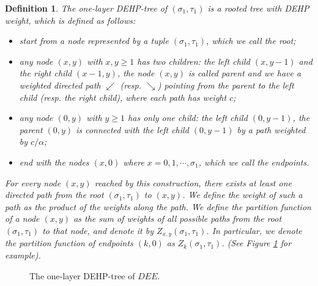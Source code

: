\documentclass[12pt,a4paper]{amsart}
\newtheorem{definition}[theorem]{Definition}
\theoremstyle{remark}
\numberwithin{equation}{section} \numberwithin{theorem}{section}
\begin{document}
\begin{definition}
\label{def:one-layer}
The {\em  one-layer DEHP-tree} of $(\sigma_1, \tau_1)$ is a rooted tree with {\em  DEHP weight}, which is defined as follows:
\begin{itemize}
\item start from a {\em node} represented by a tuple $(\sigma_1, \tau_1)$, which we call the {\em root};
\item any node $(x,y)$ with $x,y \geq 1$ has two {\em children}: the {\em left child} $(x, y-1)$ and the {\em right child} $(x-1, y)$, the node $(x,y)$ is called parent and we have a {\em weighted directed path} $\swarrow$ (resp. $\searrow$) pointing from the parent to the left child (resp. the right child), where each path has {\em weight} $c$;
\item any node $(0,y)$ with $y \geq 1$ has only one child: the {\em left child} $(0, y-1)$, the parent $(0,y)$ is connected with the left child $(0, y-1)$ by a path weighted by $c/\alpha$;
\item end with the nodes $(x,0)$ where $x=0,1,\cdots,\sigma_1$, which we call the {\em endpoints}.
\end{itemize}
For every node $(x,y)$ reached by this construction, there exists at least one directed path from the root $(\sigma_1,\tau_1)$ to $(x,y)$. We define the weight of such a path as the product of the weights along the path. We define the {\em partition function} of a node $(x,y)$ as the sum of weights of all possible paths from the root $(\sigma_1, \tau_1)$ to that node, and denote it by $Z_{x,y}(\sigma_1, \tau_1)$. In particular, we denote the partition function of endpoints $(k,0)$ as $Z_k(\sigma_1, \tau_1)$.  (See Figure \ref{fig:one-layer} for example). 
\end{definition}

%
\begin{figure}
\begin{center}
\end{center}
\caption{The one-layer DEHP-tree of $DEE$.}
\label{fig:one-layer}
\end{figure}
%
\end{document}
